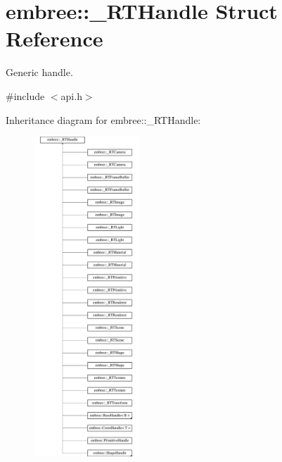 \hypertarget{structembree_1_1___r_t_handle}{
\section{embree::\_\-RTHandle Struct Reference}
\label{structembree_1_1___r_t_handle}
}


Generic handle.  




{\ttfamily \#include $<$api.h$>$}

Inheritance diagram for embree::\_\-RTHandle:\begin{figure}[H]
\begin{center}
\leavevmode
\includegraphics[height=12.000000cm]{structembree_1_1___r_t_handle}
\end{center}
\end{figure}
